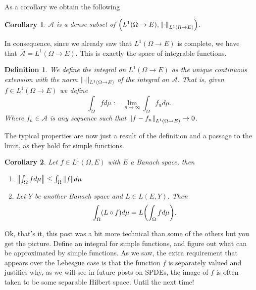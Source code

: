 \documentclass[12pt]{article}
\newtheorem{definition}{Definition}
\newtheorem{corollary}{Corollary}
\newcommand{\Aa}{\mathcal{A}}\newcommand{\Bb}{\mathcal{B}}\newcommand{\Cc}{\mathcal{C}}\newcommand{\Ee}{\mathcal{E}}\newcommand{\Ff}{\mathcal{F}}\newcommand{\Gg}{\mathcal{G}}\newcommand{\Hh}{\mathcal{H}}\newcommand{\Kk}{\mathcal{K}}\newcommand{\Ll}{\mathcal{L}}\newcommand{\Mm}{\mathcal{M}}\newcommand{\Nn}{\mathcal{N}}\newcommand{\Pp}{\mathcal{P}}\newcommand{\Qq}{\mathcal{Q}}\newcommand{\Rr}{{\mathcal R}}\newcommand{\Tt}{{\mathcal T}}\newcommand{\Zz}{{\mathcal Z}}\newcommand{\Uu}{{\mathcal U}}
\begin{document}
As a corollary we obtain the following
\begin{corollary}
	$\mathcal{A}$ is a dense subset of $\qty(L^1(\Omega\to E),\norm{\cdot}_{L^1(\Omega\to E)})$.
\end{corollary}
In consequence, since we already saw that $L^1(\Omega\to E)$ is complete, we have that $\overline{\Aa}= L^1(\Omega\to E)$. This is exactly the space of integrable functions.
\begin{definition}
	We define the integral on $L^1(\Omega\to E)$ as the unique continuous extension with the norm $\norm{\cdot}_{L^1(\Omega\to E)}$ of the integral on $\mathcal{A}$. That is, given $f\in L^1(\Omega\to E)$ we define
	\begin{equation*}
		\int_\Omega f d\mu:=\lim_{n\to\infty} \int_\Omega f_n d\mu.
	\end{equation*}
	Where $f_n\in \mathcal{A}$ is any sequence such that $\norm{f-f_n}_{L^1(\Omega\to E)}\to 0$.
\end{definition}
The typical properties are now just a result of the definition and a passage to the limit, as they hold for simple functions.
\begin{corollary}
	Let $f\in L^1(\Omega,E)$ with $E$ a Banach space, then
	\begin{enumerate}
		\item $\norm{\int_\Omega f d\mu}\leq\int_\Omega{\norm{f}d\mu} $
		\item Let $Y$ be another Banach space and $L\in L(E,Y)$. Then
		      \begin{equation*}
			      \int_\Omega (L\circ f) d\mu=L\qty(\int_\Omega f d\mu).
		      \end{equation*}
	\end{enumerate}
\end{corollary}
Ok, that's it, this post was a bit more technical than some of the others but you get the picture. Define an integral for simple functions, and figure out what can be approximated by simple functions. As we saw, the extra requirement that appears over the Lebesgue case is that the function $f$ is separately valued and justifies why, as we will see in future posts on SPDEs, the image of $f$ is often taken to be some separable Hilbert space. Until the next time!

\end{document}
